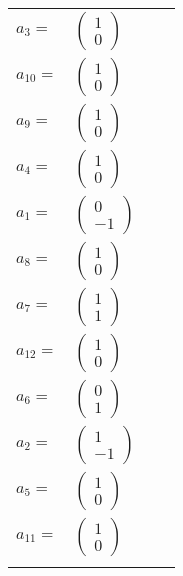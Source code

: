 \documentclass[1p]{elsarticle_modified}
\theoremstyle{definition}
\begin{document}
\begin{tabular}{m{7pt} m{180pt} m{7pt} m{180pt} }
\flushright $a_{3}=$&$\begin{pmatrix}1\\0\end{pmatrix}$ \\
\flushright $a_{10}=$&$\begin{pmatrix}1\\0\end{pmatrix}$ \\
\flushright $a_{9}=$&$\begin{pmatrix}1\\0\end{pmatrix}$ \\
\flushright $a_{4}=$&$\begin{pmatrix}1\\0\end{pmatrix}$ \\
\flushright $a_{1}=$&$\begin{pmatrix}0\\-1\end{pmatrix}$ \\
\flushright $a_{8}=$&$\begin{pmatrix}1\\0\end{pmatrix}$ \\
\flushright $a_{7}=$&$\begin{pmatrix}1\\1\end{pmatrix}$ \\
\flushright $a_{12}=$&$\begin{pmatrix}1\\0\end{pmatrix}$ \\
\flushright $a_{6}=$&$\begin{pmatrix}0\\1\end{pmatrix}$ \\
\flushright $a_{2}=$&$\begin{pmatrix}1\\-1\end{pmatrix}$ \\
\flushright $a_{5}=$&$\begin{pmatrix}1\\0\end{pmatrix}$ \\
\flushright $a_{11}=$&$\begin{pmatrix}1\\0\end{pmatrix}$\\&\end{tabular}
\end{document}
